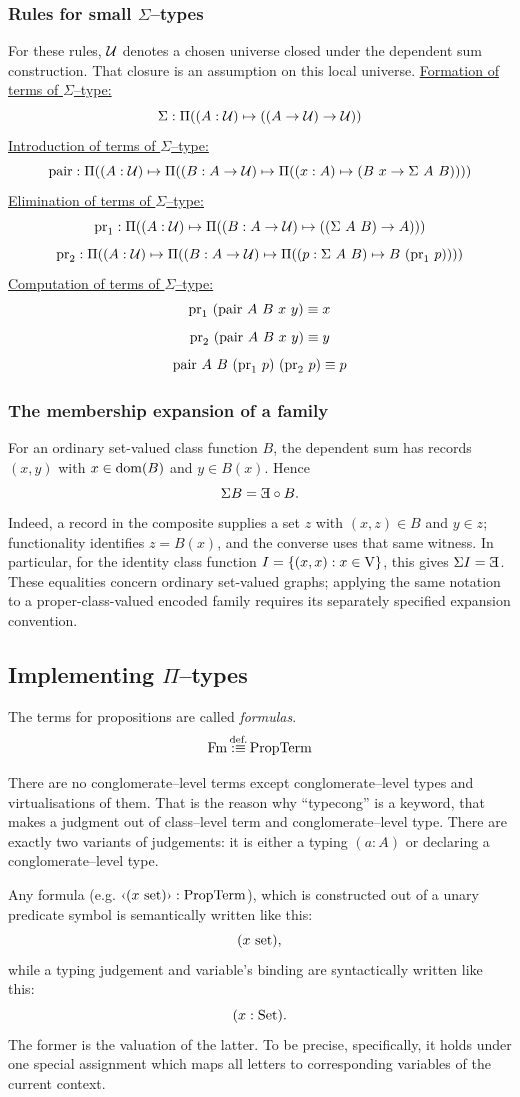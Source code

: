 \subsubsection{Rules for small $\Sigma$--types}
For these rules, $\mathcal{U}$ denotes a chosen universe closed under the dependent
sum construction. That closure is an assumption on this local universe.
\underline{Formation of terms of $\Sigma$--type:}
\[
\Sigma : \Pi((A:\mathcal{U})\mapsto((A\to \mathcal{U})\to \mathcal{U}))
\]
\underline{Introduction of terms of $\Sigma$--type:}
\[
\textrm{pair} : \Pi((A:\Un)\mapsto\Pi((B:A\to \Un)\mapsto\Pi((x:A)\mapsto(B\ x\to\Sigma\ A\ B))))
\]
\underline{Elimination of terms of $\Sigma$--type:}
\[
\textrm{pr}_1 : \Pi((A:\mathcal{U})\mapsto\Pi((B:A\to \mathcal{U})\mapsto ((\Sigma\ A\ B) \to A)))
\]
\[
\textrm{pr}_2 : \Pi((A:\Un)\mapsto\Pi((B:A\to \Un)\mapsto \Pi((p:\Sigma\ A\ B)\mapsto B\ (\pr_1\ p))))
\]
\underline{Computation of terms of $\Sigma$--type:}
\[
\mathrm{pr}_1\ (\textrm{pair}\ A\ B\ x\ y) \equiv x
\]
\[
\pr_2\ (\textrm{pair}\ A\ B\ x\ y) \equiv y
\]
\[
\textrm{pair}\ A\ B\ (\pr_1\ p)\ (\pr_2\ p) \equiv p
\]
\subsubsection{The membership expansion of a family}
For an ordinary set-valued class function $B$, the dependent sum has
records $(x,y)$ with $x\in\mathrm{dom}(B)$ and $y\in B(x)$. Hence
\[
\Sigma B=\invE\circ B.
\]
Indeed, a record in the composite supplies a set $z$ with $(x,z)\in B$
and $y\in z$; functionality identifies $z=B(x)$, and the converse
uses that same witness. In particular, for the identity class function
$I=\{(x,x):x\in\mathrm{V}\}$, this gives $\Sigma I=\invE$.
These equalities concern ordinary set-valued graphs; applying the same
notation to a proper-class-valued encoded family requires its separately
specified expansion convention.
\pagebreak
\subsection{Implementing \texorpdfstring{$\Pi$}{Pi}--types}
\begin{notation}[Fm]
The terms for propositions are called \textit{formulas}.
\[
\mathrm{Fm}\,{\stackrel{{\textrm{def.}}}{:\equiv}}\,\mathrm{Prop}\mathrm{Term}
\]
\end{notation}
\begin{notation}[typecong]
There are no conglomerate--level terms except conglomerate--level types and virtualisations of them.
That is the reason why ``typecong'' is a keyword, that makes a judgment out of class--level term and conglomerate--level type.
There are exactly two variants of judgements: it is either a typing $(a:A)$ or declaring a conglomerate--level type.
\end{notation}
\begin{notation}
Any formula (e.g. $\mquote{(x \set)}:\Prop\Term$), which is constructed out of a unary predicate symbol is semantically written like this:
\[
(x \mathrm{\ set}),
\]
while a typing judgement and variable's binding are syntactically written like this:
\[
(x:{\textrm{Set}}).
\]
The former is the valuation of the latter. To be precise, specifically, it holds under one special assignment which maps all letters to corresponding variables of the current context.
\end{notation}
